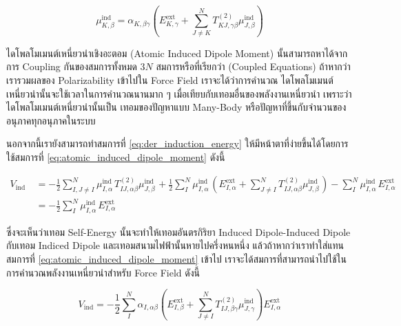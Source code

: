 \begin{equation}
  \label{eq:atomic_induced_dipole_moment}
  \mu_{K, \beta}^{\text{ind }}
  =
  \alpha_{K, \beta \gamma}
  \left(
  E_{K, \gamma}^{\mathrm{ext}}
  + \sum_{J \neq K}^N T_{K J, \gamma \beta}^{(2)} \mu_{J, \beta}^{\mathrm{ind}}
  \right)
\end{equation}

ไดโพลโมเมนต์เหนี่ยวนำเชิงอะตอม (Atomic Induced Dipole Moment) นั้นสามารถหาได้จากการ Coupling กันของสมการทั้งหมด $3 N$
สมการหรือที่เรียกว่า (Coupled Equations) ถ้าหากว่าเรารวมผลของ Polarizability เข้าไปใน Force Field เราจะได้ว่าการคำนวณ%
ไดโพลโมเมนต์เหนี่ยวนำนั้นจะใช้เวลาในการคำนวณนานมาก ๆ เมื่อเทียบกับเทอมอื่นของพลังงานเหนี่ยวนำ เพราะว่าไดโพลโมเมนต์เหนี่ยวนำนั้นเป็น%
เทอมของปัญหาแบบ Many-Body หรือปัญหาที่ขึ้นกับจำนวนของอนุภาคทุกอนุภาคในระบบ

นอกจากนี้เรายังสามารถทำสมการที่ \eqref{eq:der_induction_energy} ให้มีหน้าตาที่ง่ายขึ้นได้โดยการใช้สมการที่
\eqref{eq:atomic_induced_dipole_moment} ดังนี้

\begin{equation}
  \begin{aligned}
    V_{\text{ind }}
     & = -\frac{1}{2} \sum_{I, J \neq I}^N
    \mu_{I, \alpha}^{\text{ind }} T_{I J, \alpha \beta}^{(2)} \mu_{J, \beta}^{\text{ind }}
    +\frac{1}{2} \sum_I^N \mu_{I, \alpha}^{\text{ind }}
    \left(
    E_{I, \alpha}^{\mathrm{ext}}
    +\sum_{J \neq I}^N T_{I J, \alpha \beta}^{(2)} \mu_{J, \beta}^{\text{ind }}
    \right)
    -\sum_I^N \mu_{I, \alpha}^{\text{ind }} E_{I, \alpha}^{\text{ext }}                  \\
     & = -\frac{1}{2} \sum_I^N \mu_{I, \alpha}^{\text{ind }} E_{I, \alpha}^{\text{ext }}
  \end{aligned}
\end{equation}

\noindent ซึ่งจะเห็นว่าเทอม Self-Energy นั้นจะทำให้เทอมอันตรกิริยา Induced Dipole-Induced Dipole กับเทอม Indiced Dipole
และเทอมสนามไฟฟ้านั้นหายไปครึ่งหนหนึ่ง แล้วถ้าหากว่าเราทำใส่แทนสมการที่ \eqref{eq:atomic_induced_dipole_moment} เข้าไป
เราจะได้สมการที่สามารถนำไปใช้ในการคำนวณพลังงานเหนี่ยวนำสำหรับ Force Field ดังนี้

\begin{equation}
  V_{\mathrm{ind}}
  =
  -\frac{1}{2} \sum_I^N \alpha_{I, \alpha \beta}
  \left(
  E_{I, \beta}^{\mathrm{ext}}
  + \sum_{J \neq I}^N T_{I J, \beta \gamma}^{(2)} \mu_{J, \gamma}^{\mathrm{ind}}
  \right)
  E_{I, \alpha}^{\mathrm{ext}}
\end{equation}

